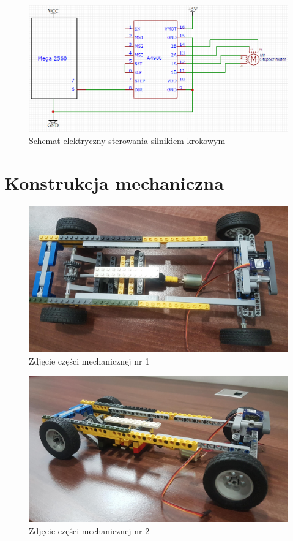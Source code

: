 \documentclass[10pt, a4paper]{article}
\begin{document}
\begin{figure}[H]
	\centering
	\includegraphics[width=\textwidth]{figures/stepper.png}
	\caption{Schemat elektryczny sterowania silnikiem krokowym}
	\label{fig:stepper}
\end{figure}

\section{Konstrukcja mechaniczna}

	\begin{figure}[H]
		\centering
		\includegraphics[width=1\textwidth]{figures/20190410_135905.jpg}
		\caption{Zdjęcie części mechanicznej nr 1}
		\label{fig:Zdjęcie części mechanicznej nr 1}
	\end{figure}
	
		\begin{figure}[H]
		\centering
		\includegraphics[width=1\textwidth]{figures/20190410_135853.jpg}
		\caption{Zdjęcie części mechanicznej nr 2}
		\label{fig:Zdjęcie części mechanicznej nr 2}
	\end{figure}
\end{document}
